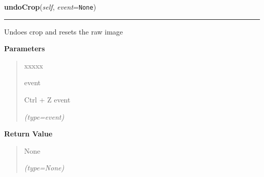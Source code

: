     \label{client_gui:GuiClass:undoCrop}

    \vspace{0.5ex}

\hspace{.8\funcindent}\begin{boxedminipage}{\funcwidth}

    \raggedright \textbf{undoCrop}(\textit{self}, \textit{event}={\tt None})

    \vspace{-1.5ex}

    \rule{\textwidth}{0.5\fboxrule}
\setlength{\parskip}{2ex}
    Undoes crop and resets the raw image

\setlength{\parskip}{1ex}
      \textbf{Parameters}
      \vspace{-1ex}

      \begin{quote}
        \begin{Ventry}{xxxxx}

          \item[event]

          Ctrl + Z event

            {\it (type=event)}

        \end{Ventry}

      \end{quote}

      \textbf{Return Value}
    \vspace{-1ex}

      \begin{quote}
      None

      {\it (type=None)}

      \end{quote}

    \end{boxedminipage}

    \label{client_gui:GuiClass:nextRaw}

    \vspace{0.5ex}

